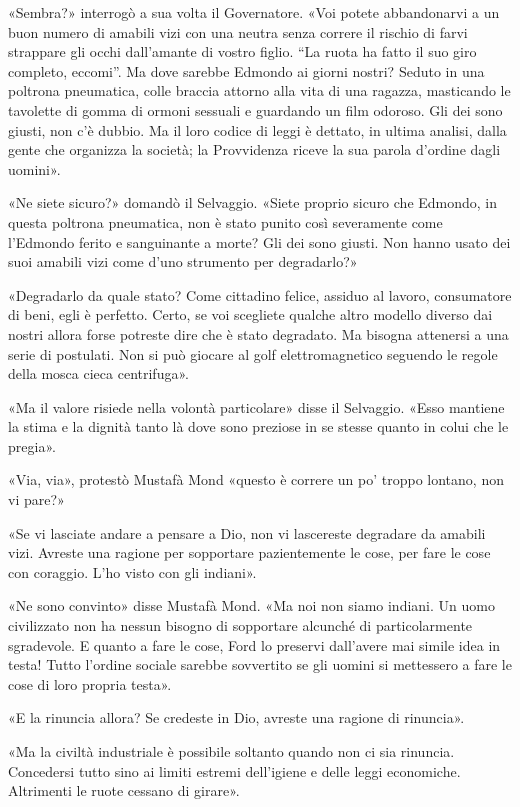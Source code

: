 \documentclass[
a5paper, %
10pt, %
twoside, 
onecolumn, %
openany, %
]{memoir}
\begin{document}
«Sembra?» interrogò a sua volta il Governatore. «Voi potete abbandonarvi a un buon numero di amabili vizi con una neutra senza correre il rischio di farvi strappare gli occhi dall’amante di vostro figlio. “La ruota ha fatto il suo giro completo, eccomi”. Ma dove sarebbe Edmondo ai giorni nostri? Seduto in una poltrona pneumatica, colle braccia attorno alla vita di una ragazza, masticando le tavolette di gomma di ormoni sessuali e guardando un film odoroso. Gli dei sono giusti, non c’è dubbio. Ma il loro codice di leggi è dettato, in ultima analisi, dalla gente che organizza la società; la Provvidenza riceve la sua parola d’ordine dagli uomini».

«Ne siete sicuro?» domandò il Selvaggio. «Siete proprio sicuro che Edmondo, in questa poltrona pneumatica, non è stato punito così severamente come l’Edmondo ferito e sanguinante a morte? Gli dei sono giusti. Non hanno usato dei suoi amabili vizi come d’uno strumento per degradarlo?»

«Degradarlo da quale stato? Come cittadino felice, assiduo al lavoro, consumatore di beni, egli è perfetto. Certo, se voi scegliete qualche altro modello diverso dai nostri allora forse potreste dire che è stato degradato. Ma bisogna attenersi a una serie di postulati. Non si può giocare al golf elettromagnetico seguendo le regole della mosca cieca centrifuga».

«Ma il valore risiede nella volontà particolare» disse il Selvaggio. «Esso mantiene la stima e la dignità tanto là dove sono preziose in se stesse quanto in colui che le pregia».

«Via, via», protestò Mustafà Mond «questo è correre un po’ troppo lontano, non vi pare?»

«Se vi lasciate andare a pensare a Dio, non vi lascereste degradare da amabili vizi. Avreste una ragione per sopportare pazientemente le cose, per fare le cose con coraggio. L’ho visto con gli indiani».

«Ne sono convinto» disse Mustafà Mond. «Ma noi non siamo indiani. Un uomo civilizzato non ha nessun bisogno di sopportare alcunché di particolarmente sgradevole. E quanto a fare le cose, Ford lo preservi dall’avere mai simile idea in testa! Tutto l’ordine sociale sarebbe sovvertito se gli uomini si mettessero a fare le cose di loro propria testa».

«E la rinuncia allora? Se credeste in Dio, avreste una ragione di rinuncia».

«Ma la civiltà industriale è possibile soltanto quando non ci sia rinuncia. Concedersi tutto sino ai limiti estremi dell’igiene e delle leggi economiche. Altrimenti le ruote cessano di girare».
\end{document}
